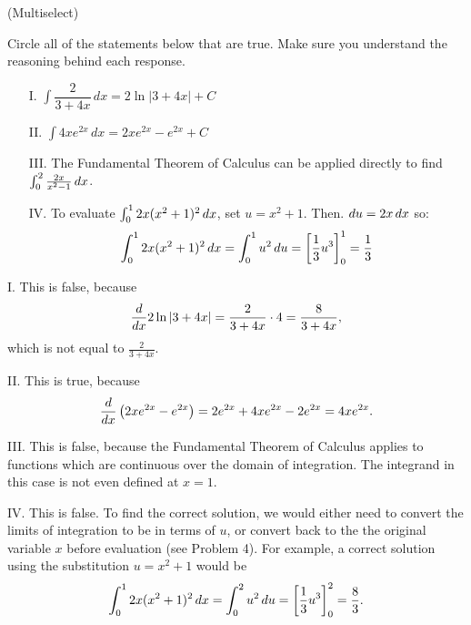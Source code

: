 \documentclass[]{ximera}
\begin{document}
\begin{problem}
(Multiselect)

Circle all of the statements below that are true.  Make sure you understand the reasoning behind each response.

\begin{itemize}
\item[I.] $\displaystyle \int \dfrac{2}{3+4x} \, dx = 2\ln|3+4x|+C$

\item[II.] $\displaystyle \int 4xe^{2x} \, dx = 2xe^{2x}-e^{2x}+C$

\item[III.] The Fundamental Theorem of Calculus can be applied directly to find $ \int_0^2 \frac{2x}{x^2-1} \mathop{}\!d x$.

\item[IV.] To evaluate $ \int_0^1 2x(x^2+1)^2 \mathop{}\!d x$, set $u=x^2+1$.  Then. $\mathop{}\!d u = 2x \mathop{}\!d x$ so:
\[ \int_0^1 2x(x^2+1)^2 \mathop{}\!d x = \int_0^1 u^2 \mathop{}\!d u = \bigg[ \frac{1}{3} u^3 \bigg]_0^1 = \frac{1}{3}\]
\end{itemize}

\end{problem}

\begin{freeResponse} I. This is false, because
$$
\frac{\mathop{}\!d}{\mathop{}\!d x} 2 \ln |3+4x| = \frac{2}{3+4x} \cdot 4 = \frac{8}{3+4x},
$$
which is not equal to $\frac{2}{3+4x}$. 

II. This is true, because
$$
\frac{\mathop{}\!d}{\mathop{}\!d x} \left( 2xe^{2x}-e^{2x}\right) = 2 e^{2x} + 4x e^{2x} - 2 e^{2x} = 4x e^{2x}.
$$

III. This is false, because the Fundamental Theorem of Calculus applies to functions which are continuous over the domain of integration. The integrand in this case is not even defined at $x=1$. 

IV. This is false. To find the correct solution, we would either need to convert the limits of integration to be in terms of $u$, or convert back to the the original variable $x$ before evaluation (see Problem 4). For example, a correct solution using the substitution $u = x^2 +1 $ would be 
$$
\int_0^1 2x(x^2+1)^2 \mathop{}\!d x = \int_0^2 u^2 \mathop{}\!d u = \bigg[ \frac{1}{3} u^3 \bigg]_0^2 = \frac{8}{3}.
$$
\end{freeResponse}
\end{document}
